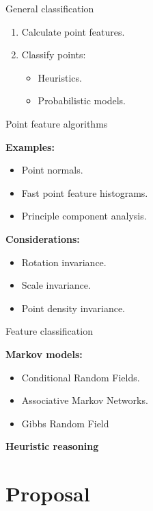 \documentclass{beamer}
\begin{document}
\begin{frame}{General classification}

\begin{enumerate}
\item Calculate point features.
\item Classify points:
\begin{itemize}
\item Heuristics.
\item Probabilistic models.
\end{itemize}
\end{enumerate}

\end{frame}

\begin{frame}{Point feature algorithms}

\textbf{Examples:}
\begin{itemize}
\item Point normals.
\item Fast point feature histograms.
\item Principle component analysis.
\end{itemize}

\textbf{Considerations:}
\begin{itemize}
\item Rotation invariance.
\item Scale invariance.
\item Point density invariance.
\end{itemize}

\end{frame}

\begin{frame}{Feature classification}

\textbf{Markov models:}
\begin{itemize}
\item Conditional Random Fields.
\item Associative Markov Networks.
\item Gibbs Random Field
\end{itemize}

\textbf{Heuristic reasoning}

\end{frame}

\section{Proposal}
\end{document}
